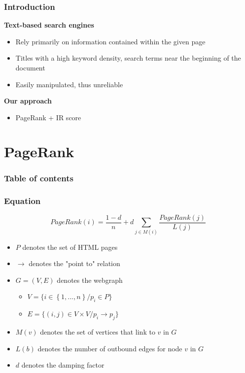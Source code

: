 \documentclass[10pt]{beamer}
\begin{document}
\begin{frame}
  \frametitle{Introduction}
  \textbf{Text-based search engines}
  \begin{itemize}
    \item Rely primarily on information contained within the given page
    \item Titles with a high keyword density, search terms near the beginning of the document
    \item Easily manipulated, thus unreliable
  \end{itemize}
  \textbf{Our approach}
  \begin{itemize}
    \item PageRank + IR score
  \end{itemize}
\end{frame}



\section{PageRank}

\begin{frame}
  \frametitle{Table of contents}
  \tableofcontents[currentsection]
\end{frame}

\begin{frame}
  \frametitle{Equation}
  $$ PageRank \left( i \right) = \frac{1 - d}{n} + d \sum\limits_{j \in M \left( i \right)} \frac{PageRank \left( j \right)}{L \left( j \right)} $$
  \newline
  \begin{itemize}
    \item $P$ denotes the set of HTML pages
    \item $\rightarrow$ denotes the "point to" relation
    \item $ G = \left( V, E \right)$ denotes the webgraph
      \begin{itemize}
        \item $V = \{i \in \left\lbrace 1, ..., n \right\rbrace / p_i \in P\}$
        \item $E = \{\left(i, j\right) \in V \times V / p_i \rightarrow p_j\}$
      \end{itemize}
    \item $M\left(v\right)$ denotes the set of vertices that link to $v$ in $G$
    \item $L\left(b\right)$ denotes the number of outbound edges for node $v$ in $G$
    \item $d$ denotes the damping factor
  \end{itemize}
\end{frame}
\end{document}
